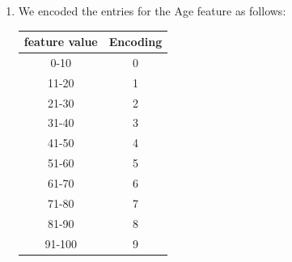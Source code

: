\documentclass[fleqn]{article}
\begin{document}
\begin{enumerate}
        \item We encoded the entries for the Age feature as follows:
            \begin{center}
            \begin{tabular}{ |c|c| } 
             \hline
             feature value & Encoding\\
             \hline
             0-10 & 0 \\ 
             11-20 & 1\\ 
             21-30 & 2\\
             31-40 & 3\\
             41-50 & 4\\
             51-60 & 5\\
             61-70 & 6\\
             71-80 & 7\\
             81-90 & 8\\
             91-100 & 9\\
             \hline
            \end{tabular}
            \end{center}
            
        
    \end{enumerate}
\end{document}
